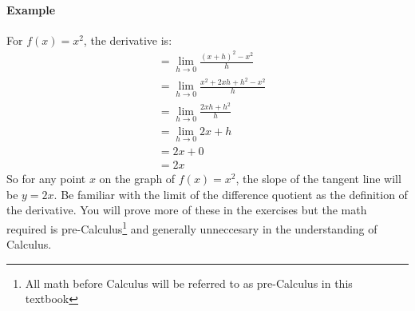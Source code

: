 \documentclass[../revisedmain.tex]{subfiles}
\begin{document}
	\paragraph {Example} For $f(x)=x^2$, the derivative is:
	\begin{equation}
	\begin{split}
	&= \lim_{h\to 0} \frac{(x+h)^2-x^2}{h} \\
	&= \lim_{h\to 0} \frac{x^2+2xh+h^2-x^2}{h} \\
	&= \lim_{h\to 0} \frac{2xh+h^2}{h} \\
	&= \lim_{h\to 0} 2x+h \\
	&= 2x+0 \\
	&= 2x
	\end{split}
	\end{equation}
	So for any point $x$ on the graph of $f(x)=x^2$, the slope of the tangent line will be $y=2x$. Be familiar with the limit of the difference quotient as the definition of the derivative. You will prove more of these in the exercises but the math required is pre-Calculus\footnote{All math before Calculus will be referred to as pre-Calculus in this textbook} and generally unneccesary in the understanding of Calculus.\\
\end{document}
